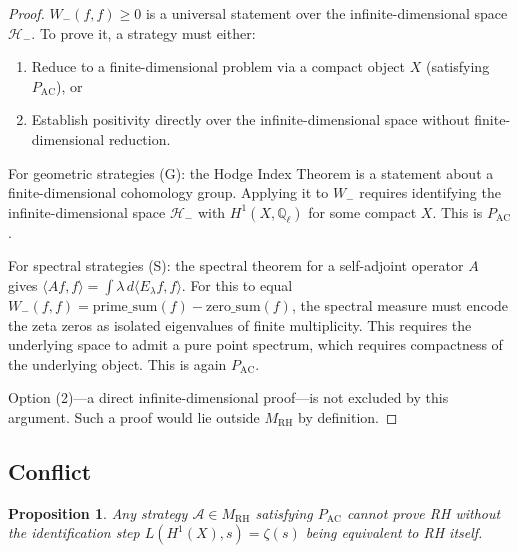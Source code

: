 \documentclass[12pt]{article}
\newtheorem{proposition}[theorem]{Proposition}
\newcommand{\Ql}{\mathbb{Q}_\ell}
\newcommand{\Hminus}{\mathcal{H}_-}
\newcommand{\MRH}{M_{\mathrm{RH}}}
\newcommand{\PAC}{P_{\mathrm{AC}}}
\begin{document}
\begin{proof}
$W_-(f,f) \geq 0$ is a universal statement over the
infinite-dimensional space $\Hminus$. To prove it, a strategy must
either:
\begin{enumerate}
\item Reduce to a finite-dimensional problem via a compact object $X$
  (satisfying $\PAC$), or
\item Establish positivity directly over the infinite-dimensional space
  without finite-dimensional reduction.
\end{enumerate}
For geometric strategies (G): the Hodge Index Theorem is a statement
about a finite-dimensional cohomology group. Applying it to $W_-$
requires identifying the infinite-dimensional space $\Hminus$ with
$H^1(X,\Ql)$ for some compact $X$. This is $\PAC$.

For spectral strategies (S): the spectral theorem for a self-adjoint
operator $A$ gives $\langle Af, f\rangle = \int \lambda\, d\langle
E_\lambda f, f\rangle$. For this to equal $W_-(f,f) =
\mathrm{prime\_sum}(f) - \mathrm{zero\_sum}(f)$, the spectral measure
must encode the zeta zeros as isolated eigenvalues of finite
multiplicity. This requires the underlying space to admit a pure point
spectrum, which requires compactness of the underlying object. This
is again $\PAC$.

Option (2)---a direct infinite-dimensional proof---is not excluded
by this argument. Such a proof would lie outside $\MRH$ by definition.
\end{proof}

\subsection{Conflict}

\begin{proposition}
\label{prop:conflict}
Any strategy $\mathcal{A} \in \MRH$ satisfying $\PAC$ cannot prove RH
without the identification step $L(H^1(X),s) = \zeta(s)$ being
equivalent to RH itself.
\end{proposition}
\end{document}
